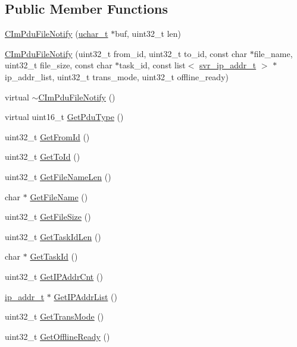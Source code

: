 \subsection*{Public Member Functions}
\begin{DoxyCompactItemize}
\item 
\hyperlink{class_c_im_pdu_file_notify_a9f57fe4b2ceb75dda4430837054d12b8}{C\+Im\+Pdu\+File\+Notify} (\hyperlink{base_2ostype_8h_a124ea0f8f4a23a0a286b5582137f0b8d}{uchar\+\_\+t} $\ast$buf, uint32\+\_\+t len)
\item 
\hyperlink{class_c_im_pdu_file_notify_a1199897c1a17772dc93db0f37002cd15}{C\+Im\+Pdu\+File\+Notify} (uint32\+\_\+t from\+\_\+id, uint32\+\_\+t to\+\_\+id, const char $\ast$file\+\_\+name, uint32\+\_\+t file\+\_\+size, const char $\ast$task\+\_\+id, const list$<$ \hyperlink{structsvr__ip__addr__t}{svr\+\_\+ip\+\_\+addr\+\_\+t} $>$ $\ast$ip\+\_\+addr\+\_\+list, uint32\+\_\+t trans\+\_\+mode, uint32\+\_\+t offline\+\_\+ready)
\item 
virtual \hyperlink{class_c_im_pdu_file_notify_a80ee23d4859fdc170c239970f09e67b0}{$\sim$\+C\+Im\+Pdu\+File\+Notify} ()
\item 
virtual uint16\+\_\+t \hyperlink{class_c_im_pdu_file_notify_ac9cf173245622f3f2705da9b82a5cf13}{Get\+Pdu\+Type} ()
\item 
uint32\+\_\+t \hyperlink{class_c_im_pdu_file_notify_a7b53b2ae8beb0d4151796c7b5a391d7d}{Get\+From\+Id} ()
\item 
uint32\+\_\+t \hyperlink{class_c_im_pdu_file_notify_a6bdfdd11bd18c35a872d3d32a9728ba8}{Get\+To\+Id} ()
\item 
uint32\+\_\+t \hyperlink{class_c_im_pdu_file_notify_a65239540afd6aecaaaa9bbe0f6d5371d}{Get\+File\+Name\+Len} ()
\item 
char $\ast$ \hyperlink{class_c_im_pdu_file_notify_acc991f295bb483653ed9e4726ae6326c}{Get\+File\+Name} ()
\item 
uint32\+\_\+t \hyperlink{class_c_im_pdu_file_notify_afe93584da77d9a2054685a9319e40df7}{Get\+File\+Size} ()
\item 
uint32\+\_\+t \hyperlink{class_c_im_pdu_file_notify_a838507b080779299d104cbb3bd99d055}{Get\+Task\+Id\+Len} ()
\item 
char $\ast$ \hyperlink{class_c_im_pdu_file_notify_ab2e8cf25e7af6f4fe2fd435e3837a146}{Get\+Task\+Id} ()
\item 
uint32\+\_\+t \hyperlink{class_c_im_pdu_file_notify_aee9d0b740e2184f2409cbd0adb03fd7e}{Get\+I\+P\+Addr\+Cnt} ()
\item 
\hyperlink{structip__addr__t}{ip\+\_\+addr\+\_\+t} $\ast$ \hyperlink{class_c_im_pdu_file_notify_acc3dac05bc5205fd0660add0291948e5}{Get\+I\+P\+Addr\+List} ()
\item 
uint32\+\_\+t \hyperlink{class_c_im_pdu_file_notify_af0196a4ccd5046459a47b1e56602f0ed}{Get\+Trans\+Mode} ()
\item 
uint32\+\_\+t \hyperlink{class_c_im_pdu_file_notify_a5511bde0c4d84f7796f0355d7041e889}{Get\+Offline\+Ready} ()
\end{DoxyCompactItemize}
